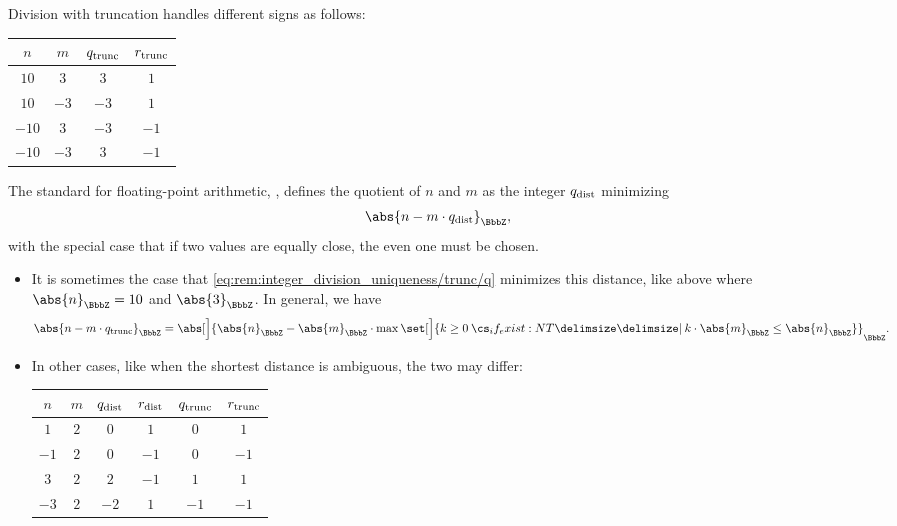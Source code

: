 \begin{remark}
\begin{thmenum}
    Division with truncation handles different signs as follows:
    \begin{center}
      \begin{tabular}{c c c c}
        \( n \)   & \( m \)  & \( q_{\T{trunc}} \) & \( r_{\T{trunc}} \) \\
        \hline
        \( 10 \)  & \( 3 \)  & \( 3 \)             & \( 1 \) \\
        \( 10 \)  & \( -3 \) & \( -3 \)            & \( 1 \) \\
        \( -10 \) & \( 3 \)  & \( -3 \)            & \( -1 \) \\
        \( -10 \) & \( -3 \) & \( 3 \)             & \( -1 \)
      \end{tabular}
    \end{center}

     The standard for floating-point arithmetic, \cite[31]{IEEE:754:2019}, defines the quotient of \( n \) and \( m \) as the integer \( q_{\T{dist}} \) minimizing
    \begin{equation}\label{eq:rem:integer_division_uniqueness/dist/q}
      \abs{n - m \cdot q_{\T{dist}}}_\BbbZ,
    \end{equation}
    with the special case that if two values are equally close, the even one must be chosen.

    \begin{itemize}
      \item It is sometimes the case that \eqref{eq:rem:integer_division_uniqueness/trunc/q} minimizes this distance, like above where \( \abs{n}_\BbbZ = 10 \) and \( \abs{3}_\BbbZ \). In general, we have
      \begin{equation*}
        \abs{ n - m \cdot q_{\T{trunc}} }_\BbbZ
        =
        \abs[\Big]{ \abs{n}_\BbbZ - \abs{m}_\BbbZ \cdot \max\set[\Big]{ k \geq 0 \given* k \cdot \abs{m}_\BbbZ \leq \abs{n}_\BbbZ } }_\BbbZ.
      \end{equation*}

      \item In other cases, like when the shortest distance is ambiguous, the two may differ:
      \begin{center}
        \begin{tabular}{c c | c c | c c}
          \( n \)  & \( m \) & \( q_{\T{dist}} \) & \( r_{\T{dist}} \) & \( q_{\T{trunc}} \) & \( r_{\T{trunc}} \) \\
          \hline
          \( 1 \)  & \( 2 \) & \( 0 \)            & \( 1 \)            & \( 0 \)             & \( 1 \) \\
          \( -1 \) & \( 2 \) & \( 0 \)            & \( -1 \)           & \( 0 \)             & \( -1 \) \\
          \( 3 \)  & \( 2 \) & \( 2 \)            & \( -1 \)           & \( 1 \)             & \( 1 \) \\
          \( -3 \) & \( 2 \) & \( -2 \)           & \( 1 \)            & \( -1 \)            & \( -1 \)
        \end{tabular}
      \end{center}


\end{itemize}
\end{thmenum}
\end{remark}
